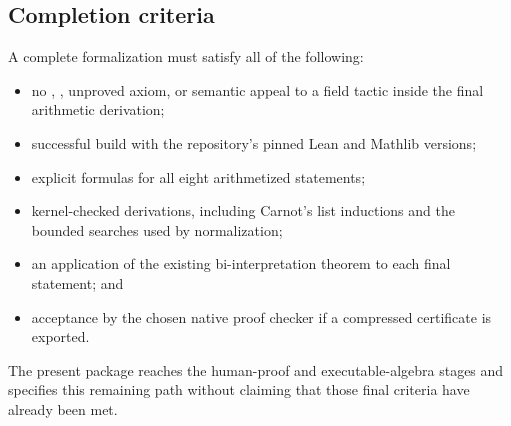\subsection{Completion criteria}

A complete formalization must satisfy all of the following:
\begin{itemize}
\item no , , unproved axiom, or semantic appeal to a
field tactic inside the final arithmetic derivation;
\item successful build with the repository's pinned Lean and Mathlib versions;
\item explicit formulas for all eight arithmetized statements;
\item kernel-checked  derivations, including Carnot's list
inductions and the bounded searches used by normalization;
\item an application of the existing bi-interpretation theorem to each final
statement; and
\item acceptance by the chosen native proof checker if a compressed
certificate is exported.
\end{itemize}
The present package reaches the human-proof and executable-algebra stages and
specifies this remaining path without claiming that those final criteria have
already been met.
